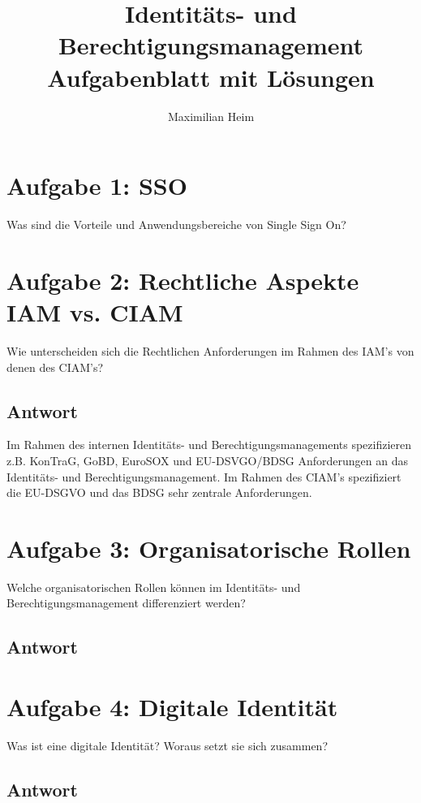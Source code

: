 \documentclass[11pt]{article}
\author{Maximilian Heim}
\title{Identitäts- und Berechtigungsmanagement \\ \large{}Aufgabenblatt mit Lösungen}
\begin{document}
\maketitle
\section*{Aufgabe 1: SSO}
Was sind die Vorteile und Anwendungsbereiche von Single Sign On?

\section*{Aufgabe 2: Rechtliche Aspekte IAM vs. CIAM}
Wie unterscheiden sich die Rechtlichen Anforderungen im Rahmen des IAM's von denen des CIAM's?
\subsection{Antwort}
Im Rahmen des internen Identitäts- und Berechtigungsmanagements spezifizieren z.B. KonTraG, GoBD, EuroSOX und EU-DSVGO/BDSG Anforderungen an das Identitäts- und Berechtigungsmanagement. Im Rahmen des CIAM's spezifiziert die EU-DSGVO und das BDSG sehr zentrale Anforderungen.

\section*{Aufgabe 3: Organisatorische Rollen}
Welche organisatorischen Rollen können im Identitäts- und Berechtigungsmanagement differenziert werden?
\subsection{Antwort}

\section*{Aufgabe 4: Digitale Identität}
Was ist eine digitale Identität? Woraus setzt sie sich zusammen?
\subsection{Antwort}
\end{document}
